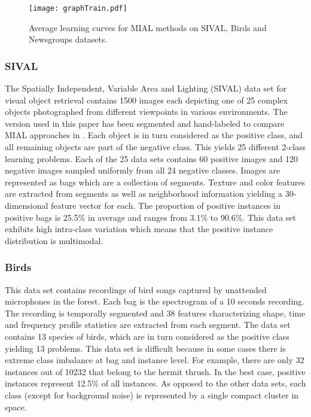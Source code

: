 \documentclass{article}
\begin{document}
\begin{figure*}[t!]
\centering
\texttt{[image: graphTrain.pdf]}
\caption{Average learning curves for MIAL methods on SIVAL, Birds and Newsgroups datasets.}
\label{Fig:GraphTrain}
\end{figure*}

\subsubsection{SIVAL} 
The Spatially Independent, Variable Area and Lighting (SIVAL) data set for visual object retrieval \cite{Rahmani2005} contains 1500 images each depicting one of 25 complex objects photographed from different viewpoints in various environments. The version used in this paper has been segmented and hand-labeled to compare MIAL approaches in \cite{Settles2008}. Each object is in turn considered as the positive class, and all remaining objects are part of the negative class. This yields 25 different 2-class learning problems. Each of the 25 data sets contains 60 positive images and 120 negative images sampled uniformly from all 24 negative classes. Images are represented as bags which are a collection of segments. Texture and color features are extracted from segments as well as neighborhood information yielding a 30-dimensional feature vector for each. The proportion of positive instances in positive bags is 25.5\% in average and ranges from 3.1\% to 90.6\%. This data set exhibits high intra-class variation which means that the positive instance distribution is multimodal. 

\subsubsection{Birds}
This data set \cite{Briggs2012} contains recordings of bird songs captured by unattended microphones in the forest. Each bag is the spectrogram of a 10 seconds recording. The recording is temporally segmented and 38 features characterizing shape, time and frequency profile statistics are extracted from each segment. The data set contains 13 species of birds, which are in turn considered as the positive class yielding 13 problems. This data set is difficult because in some cases there is extreme class imbalance at bag and instance level. For example, there are only 32 instances out of 10232 that belong to the hermit thrush. In the best case, positive instances represent 12.5\% of all instances. As opposed to the other data sets, each class (except for background noise) is represented by a single compact cluster in space. 
\end{document}
